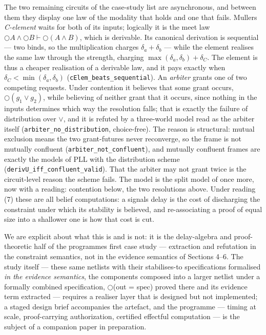 The two remaining circuits of the case-study list are asynchronous, and
between them they display one law of the modality that holds and one
that fails. Muller\textquotesingle s \emph{C-element} waits for both of
its inputs; logically it is the meet law \ensuremath{\bigcirc A \wedge
\bigcirc B \vdash \bigcirc(A \wedge B)}, which is derivable. Its
canonical derivation is sequential --- two binds, so the multiplication
charges \ensuremath{\delta_{a} + \delta_{b}} --- while the element
realises the same law through the strength, charging
\ensuremath{\max(\delta_{a}, \delta_{b}) + \delta_{C}}. The element is
thus a cheaper realisation of a derivable law, and it pays exactly when
\ensuremath{\delta_{C} < \min(\delta_{a}, \delta_{b})}
(\texttt{cElem\_beats\_sequential}). An \emph{arbiter} grants one of two
competing requests. Under contention it believes that some grant occurs,
\ensuremath{\bigcirc(g_{1} \vee g_{2})}, while believing of neither grant
that it occurs, since nothing in the inputs determines which way the
resolution falls; that is exactly the failure of distribution over
\ensuremath{\vee}, and it is refuted by a three-world model read as the
arbiter itself (\texttt{arbiter\_no\_distribution}, choice-free). The
reason is structural: mutual exclusion means the two grant-futures never
reconverge, so the frame is not mutually confluent
(\texttt{arbiter\_not\_confluent}), and mutually confluent frames are
exactly the models of PLL with the distribution scheme
(\texttt{derivU\_iff\_confluent\_valid}). That the arbiter may not grant
twice is the circuit-level reason the scheme fails. The model is the
split model of \cite[Fig.~3]{FairtloughMendler1997} once more, now with
a reading: contention below, the two resolutions above. Under reading (7) these
are all belief computations: a signal\textquotesingle s delay is the cost
of discharging the constraint under which its stability is believed,
and re-associating a proof of equal size into a shallower one is how
that cost is cut.

We are explicit about what this is and is not: it is the delay-algebra
and proof-theoretic half of the programme\textquotesingle s first case
study --- extraction and refutation in the constraint semantics, not in
the evidence semantics of Sections 4--6. The study itself --- these same
netlists with their stabilises-to specifications formalised
\emph{in the evidence semantics}, the components composed into a larger
netlist under a formally combined specification,
\ensuremath{\bigcirc}(out = spec) proved there and its evidence term
extracted --- requires a realiser layer that is designed but not
implemented; a staged design brief accompanies the artefact, and the
programme --- timing at scale, proof-carrying authorization, certified
effectful computation --- is the subject of a companion paper in
preparation.

